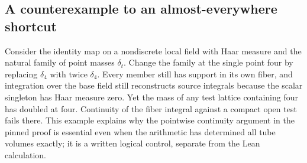 \documentclass[12pt,letterpaper]{article}
\begin{document}
\subsection{A counterexample to an almost-everywhere shortcut}
Consider the identity map on a nondiscrete local field with Haar measure and the natural family of point masses $\delta_t$. Change the family at the single point four by replacing $\delta_4$ with twice $\delta_4$. Every member still has support in its own fiber, and integration over the base field still reconstructs source integrals because the scalar singleton has Haar measure zero. Yet the mass of any test lattice containing four has doubled at four. Continuity of the fiber integral against a compact open test fails there. This example explains why the pointwise continuity argument in the pinned proof is essential even when the arithmetic has determined all tube volumes exactly; it is a written logical control, separate from the Lean calculation.
\end{document}
